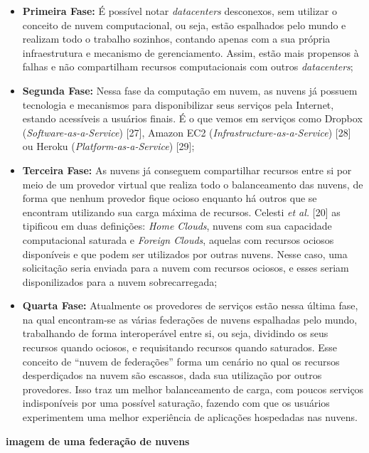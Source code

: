 \begin{itemize}
	\item \textbf{Primeira Fase:} É possível notar \textit{datacenters} desconexos, sem utilizar o conceito de nuvem computacional, ou seja, estão espalhados pelo mundo e realizam todo o trabalho sozinhos, contando apenas com a sua própria infraestrutura e mecanismo de gerenciamento. Assim, estão mais propensos à falhas e não compartilham recursos computacionais com outros \textit{datacenters};
    \item \textbf{Segunda Fase:} Nessa fase da computação em nuvem, as nuvens já possuem tecnologia e mecanismos para disponibilizar seus serviços pela Internet, estando acessíveis a usuários finais. É o que vemos em serviços como Dropbox (\textit{Software-as-a-Service}) [27], Amazon EC2 (\textit{Infrastructure-as-a-Service}) [28] ou Heroku (\textit{Platform-as-a-Service}) [29];
    \item \textbf{Terceira Fase:} As nuvens já conseguem compartilhar recursos entre si por meio de um provedor virtual que realiza todo o balanceamento das nuvens, de forma que nenhum provedor fique ocioso enquanto há outros que se encontram utilizando sua carga máxima de recursos. Celesti \textit{et al.} [20] as tipificou em duas definições: \textit{Home Clouds}, nuvens com sua capacidade computacional saturada e \textit{Foreign Clouds}, aquelas com recursos ociosos disponíveis e que podem ser utilizados por outras nuvens. Nesse caso, uma solicitação seria enviada para a nuvem com recursos ociosos, e esses seriam disponilizados para a nuvem sobrecarregada;
    \item \textbf{Quarta Fase:} Atualmente os provedores de serviços estão nessa última fase, na qual encontram-se as várias federações de nuvens espalhadas pelo mundo, trabalhando de forma interoperável entre si, ou seja, dividindo os seus recursos quando ociosos, e requisitando recursos quando saturados. Esse conceito de ``nuvem de federações'' forma um cenário no qual os recursos desperdiçados na nuvem são escassos, dada sua utilização por outros provedores. Isso traz um melhor balanceamento de carga, com poucos serviços indisponíveis por uma possível saturação, fazendo com que os usuários experimentem uma melhor experiência de aplicações hospedadas nas nuvens. 
\end{itemize}

\begin{center}
	\textbf{\small{imagem de uma federação de nuvens}}
\end{center}

